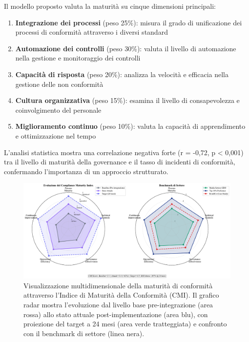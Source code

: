 Il modello proposto valuta la maturità su cinque dimensioni principali:

\begin{enumerate}
\item \textbf{Integrazione dei processi} (peso 25\%): misura il grado di unificazione dei processi di conformità attraverso i diversi standard
\item \textbf{Automazione dei controlli} (peso 30\%): valuta il livello di automazione nella gestione e monitoraggio dei controlli
\item \textbf{Capacità di risposta} (peso 20\%): analizza la velocità e efficacia nella gestione delle non conformità
\item \textbf{Cultura organizzativa} (peso 15\%): esamina il livello di consapevolezza e coinvolgimento del personale
\item \textbf{Miglioramento continuo} (peso 10\%): valuta la capacità di apprendimento e ottimizzazione nel tempo
\end{enumerate}

L'analisi statistica mostra una correlazione negativa forte (r = -0,72, p < 0,001) tra il livello di maturità della governance e il tasso di incidenti di conformità, confermando l'importanza di un approccio strutturato.

\begin{figure}[htbp]
\centering
\includegraphics[width=\textwidth]{thesis_figures/cap4/figura_4_2_cmi_radar.pdf}
\caption{Visualizzazione multidimensionale della maturità di conformità attraverso l'Indice di Maturità della Conformità (CMI). Il grafico radar mostra l'evoluzione dal livello base pre-integrazione (area rossa) allo stato attuale post-implementazione (area blu), con proiezione del target a 24 mesi (area verde tratteggiata) e confronto con il benchmark di settore (linea nera).}
\label{fig:cmi_radar}
\end{figure}

